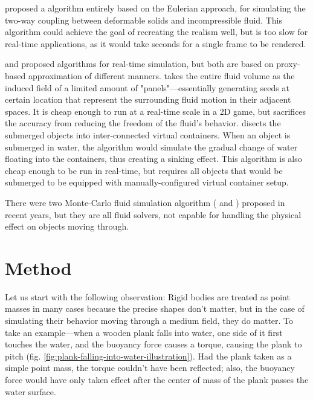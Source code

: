 \documentclass{article}
\begin{document}
\cite{teng2016eulerian} proposed a algorithm entirely based on the Eulerian approach, for simulating the two-way coupling between deformable solids and incompressible fluid.
This algorithm could achieve the goal of recreating the realism well, but is too slow for real-time applications, as it would take seconds for a single frame to be rendered.

\cite{GER13} and \cite{BAJ20} proposed algorithms for real-time simulation, but both are based on proxy-based approximation of different manners.
\cite{GER13} takes the entire fluid volume as the induced field of a
limited amount of "panels"---essentially generating seeds at certain location that represent the surrounding fluid motion in their adjacent spaces.
It is cheap enough to run at a real-time scale in a 2D game, but sacrifices the accuracy from reducing the freedom of the fluid’s behavior.
\cite{BAJ20} disects the submerged objects into inter-connected virtual containers.
When an object is submerged in water, the algorithm would simulate the gradual change of water floating into the containers, thus creating a sinking effect.
This algorithm is also cheap enough to be run in real-time, but requires all objects that would be submerged to be equipped with manually-configured virtual container setup.

There were two Monte-Carlo fluid simulation algorithm (\cite{sugimoto2024velocity} and \cite{rioux2022monte}) proposed in recent years, but they are all fluid solvers, not capable for handling the physical effect on objects moving through.

\section{Method}

Let us start with the following observation:
Rigid bodies are treated as point masses in many cases because the precise shapes don't matter, but in the case of simulating their behavior moving through a medium field, they do matter.
To take an example---when a wooden plank falls into water, one side of it first touches the water, and the buoyancy force causes a torque, causing the plank to pitch (fig. \ref{fig:plank-falling-into-water-illustration}).
Had the plank taken as a simple point mass, the torque couldn't have been reflected;
also, the buoyancy force would have only taken effect after the center of mass of the plank passes the water surface.
\end{document}
